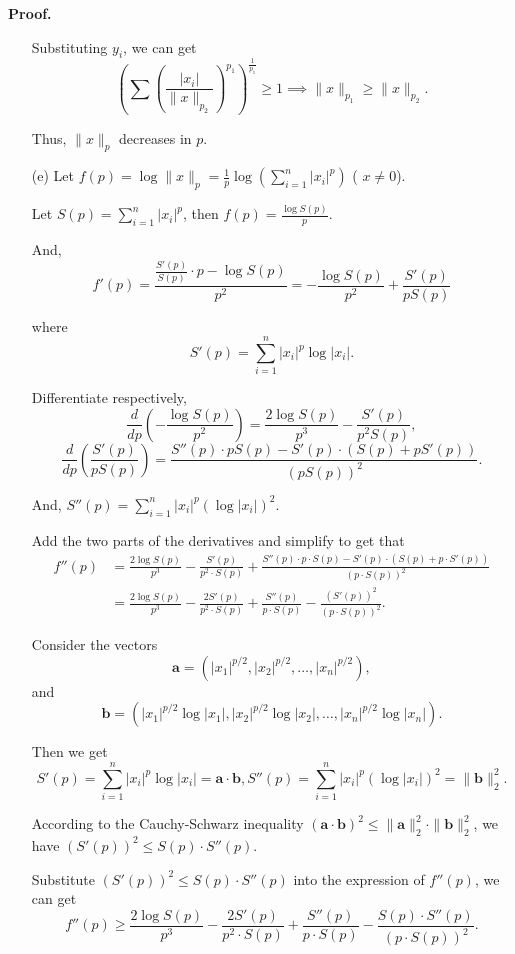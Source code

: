 \documentclass[a4paper, 11pt]{article}
\newenvironment{solution}
    {\textbf{Proof.}}
    {}
\begin{document}
\begin{solution}
\begin{enumerate}
	 Substituting \( y_i \), we can get
$$
	 \left( \sum \left( \frac{|x_i|}{\|x\|_{p_2}} \right)^{p_1} \right)^{\frac{1}{p_1}} \geq 1 \implies \|x\|_{p_1} \geq \|x\|_{p_2}.
$$
	 
	 Thus, \( \|x\|_p \) decreases in \( p \).
	 	 
	\item[(e)] 
Let \( f(p) = \log \|x\|_p = \frac{1}{p} \log \left( \sum_{i=1}^n |x_i|^p \right) \) ( \( x \neq 0 \)).

Let \( S(p) = \sum_{i=1}^n |x_i|^p \), then \( f(p) = \frac{\log S(p)}{p} \).

And, $$ f'(p) = \frac{\frac{S'(p)}{S(p)} \cdot p - \log S(p)}{p^2}=-\frac{\log S(p)}{p^2}+\frac{S'(p)}{pS(p)}$$

where $$ S'(p) = \sum_{i=1}^n |x_i|^p \log |x_i| .$$
	 	 
Differentiate respectively,
$$
\frac{d}{dp}\left(-\frac{\log S(p)}{p^2}\right)=\frac{2\log S(p)}{p^3}-\frac{S'(p)}{p^2S(p)},
$$
$$
\frac{d}{dp}\left(\frac{S'(p)}{pS(p)}\right)=\frac{S''(p)\cdot pS(p)-S'(p)\cdot(S(p)+pS'(p))}{(pS(p))^2}.
$$

And, \( S''(p)=\sum_{i = 1}^n|x_i|^p(\log|x_i|)^2 \).

Add the two parts of the derivatives and simplify to get that 
\begin{align*}
	f''(p)&=\frac{2\log S(p)}{p^3}-\frac{S'(p)}{p^2\cdot S(p)}+\frac{S''(p)\cdot p\cdot S(p)-S'(p)\cdot(S(p)+p\cdot S'(p))}{(p\cdot S(p))^2}\\
	&=\frac{2\log S(p)}{p^3}-\frac{2S'(p)}{p^2\cdot S(p)}+\frac{S''(p)}{p\cdot S(p)}-\frac{(S'(p))^2}{(p\cdot S(p))^2}.
\end{align*}

Consider the vectors 
$$
 \mathbf{a} = \left(|x_1|^{p/2}, |x_2|^{p/2}, \dots, |x_n|^{p/2}\right) ,
 $$
 and 
 $$
  \mathbf{b} = \left(|x_1|^{p/2}\log|x_1|, |x_2|^{p/2}\log|x_2|, \dots, |x_n|^{p/2}\log|x_n|\right) .
  $$ 
  
  Then we get 
$$
 S'(p)=\sum_{i = 1}^n|x_i|^p\log|x_i|=\mathbf{a}\cdot\mathbf{b} ,  S''(p)=\sum_{i = 1}^n|x_i|^p(\log|x_i|)^2=\|\mathbf{b}\|_2^2.
$$

According to the Cauchy-Schwarz inequality \( (\mathbf{a}\cdot\mathbf{b})^2\leq\|\mathbf{a}\|_2^2\cdot\|\mathbf{b}\|_2^2 \), we have \( (S'(p))^2\leq S(p)\cdot S''(p) \).

Substitute \( (S'(p))^2\leq S(p)\cdot S''(p) \) into the expression of \( f''(p) \), we can get
$$
f''(p)\geq\frac{2\log S(p)}{p^3}-\frac{2S'(p)}{p^2\cdot S(p)}+\frac{S''(p)}{p\cdot S(p)}-\frac{S(p)\cdot S''(p)}{(p\cdot S(p))^2}.
$$


\end{enumerate}
\end{solution}
\end{document}
